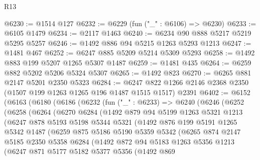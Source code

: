\begin{lexlean}{R13}
\begin{coremodule}
@6230 := @1514 @127
@6232 := @6229 (fun ("_" : @6106) => @6230)
@6233 := @6105 @1479
@6234 := @2117 @1463
@6240 := @6234 @90 @888 @5217 @5219 @5295 @5257
@6246 := @1492 @886 @94 @5215 @1263 @5293 @1213
@6247 := @1481 @467
@6252 := @6247 @885 @5209 @5214 @5309 @5293
@6258 := @1492 @883 @199 @5207 @1265 @5307 @1487
@6259 := @1481 @435
@6264 := @6259 @882 @5202 @5206 @5324 @5307
@6265 := @1492 @823
@6270 := @6265 @881 @2147 @5201 @2350 @5323
@6284 := @6247 @822 @1266 @2146 @2368 @2350 (@1507 @199 @1263 @1265 @196 @1487 @1515 @1517) @2391
@6402 := @6152
    (@6163
      (@6180
        (@6186
          (@6232
            (fun ("_" : @6233) =>
            @6240
              (@6246
                (@6252
                  (@6258
                    (@6264
                      (@6270
                        @6284
                        (@1492
                          @879
                          @94
                          @5199
                          @1263
                          @5321
                          @1213
                          (@6247
                            @878
                            @5193
                            @5198
                            @5344
                            @5321
                            (@1492
                              @876
                              @199
                              @5191
                              @1265
                              @5342
                              @1487
                              (@6259
                                @875
                                @5186
                                @5190
                                @5359
                                @5342
                                (@6265
                                  @874
                                  @2147
                                  @5185
                                  @2350
                                  @5358
                                  @6284
                                  (@1492
                                    @872
                                    @94
                                    @5183
                                    @1263
                                    @5356
                                    @1213
                                    (@6247
                                      @871
                                      @5177
                                      @5182
                                      @5377
                                      @5356
                                      (@1492
                                        @869

\end{coremodule}
\end{lexlean}
